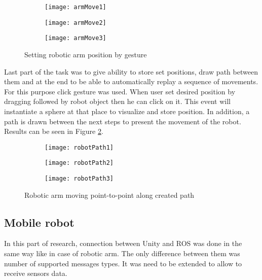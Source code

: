 \documentclass[printmode,en]{mgr}
\begin{document}
\begin{figure}[!ht]
\centering
\begin{subfigure}{.33\textwidth}
  \centering
  \texttt{[image: armMove1]}
\end{subfigure}%
\begin{subfigure}{.33\textwidth}
  \centering
  \texttt{[image: armMove2]}
\end{subfigure}
\begin{subfigure}{.33\textwidth}
  \centering
  \texttt{[image: armMove3]}
\end{subfigure}%
\caption{Setting robotic arm position by gesture}
\label{fig:armMove}
\end{figure}

Last part of the task was to give ability to store set positions, draw path between them and at the end to be able to automatically replay a sequence of movements. For this purpose click gesture was used. When user set desired position by dragging followed by robot object then he can click on it. This event will instantiate a sphere at that place to visualize and store position. In addition, a path is drawn between the next steps to present the movement of the robot. Results can be seen in Figure
\ref{fig:robotPath}.

\begin{figure}[!ht]
\centering
\begin{subfigure}{.33\textwidth}
  \centering
  \texttt{[image: robotPath1]}
\end{subfigure}%
\begin{subfigure}{.33\textwidth}
  \centering
  \texttt{[image: robotPath2]}
\end{subfigure}
\begin{subfigure}{.33\textwidth}
  \centering
  \texttt{[image: robotPath3]}
\end{subfigure}%
\caption{Robotic arm moving point-to-point along created path}
\label{fig:robotPath}
\end{figure}

\subsection{Mobile robot}
In this part of research, connection between Unity and ROS was done in the same way like in case of robotic arm. The only difference between them was number of supported messages types. It was need to be extended to allow to receive sensors data.
\end{document}
